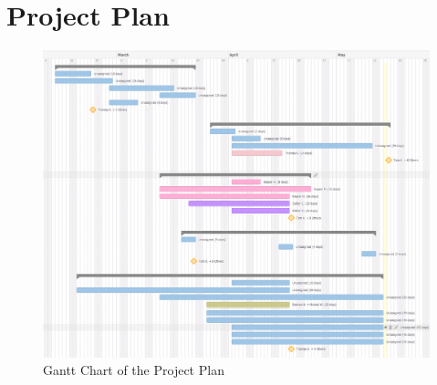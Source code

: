 \section{Project Plan} \label{sec:project-plan}
\begin{figure}[ht]
\centering
\includegraphics[width=\columnwidth]{images/gantt-chart.png}
\caption{Gantt Chart of the Project Plan}
\label{fig:gantt-chart}
\end{figure}